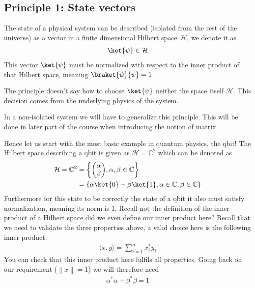 \subsection{Principle 1: State vectors}

The state of a physical system can be described (isolated from the rest of the universe) as a vector in a finite dimensional Hilbert space $\mathcal{H}$, we denote it as
\begin{align*} 
	\ket{\psi} \in \mathcal{H} 
\end{align*}
This vector $\ket{\psi}$ must be normalized with respect to the inner product of that Hilbert space, meaning $\braket{\psi}{\psi} = 1$.
\begin{framedremark}
The principle doesn't say how to choose $\ket{\psi}$ neither the space itself $\mathcal{H}$. This decision comes from the underlying physics of the system.
\end{framedremark}
\begin{framedremark}
In a non-isolated system we will have to generalize this principle. This will be done in later part of the course when introducing the notion of  matrix.
\end{framedremark}
    Hence let us start with the most basic example in quantum physics, the qbit! The Hilbert space describing a qbit is given as $\mathcal{H} = \mathbb{C}^2$ which can be denoted as 
	\begin{align*} 
		\mathcal{H} = \mathbb{C}^2 &= \left\{\begin{pmatrix} \alpha \\ \beta \end{pmatrix}, \alpha, \beta \in \mathbb{C} \right\} \\
								   &= \left\{\alpha \ket{0} + \beta\ket{1}, \alpha \in \mathbb{C}, \beta \in \mathbb{C}\right\}
	\end{align*}
	Furthermore for this state to be correctly the state of a qbit it also must satisfy normalization, meaning its norm is 1. Recall not the definition of the inner product of a Hilbert space did we even define our inner product here? Recall that we need to validate the three properties above, a valid choice here is the following inner product:
	\begin{align*} 
		\langle x, y\rangle  = \sum_{i= 1}^{n} x_i^{\ast}y_i
	\end{align*}
	You can check that this inner product here fulfils all properties. Going back on our requirement ($\left\|x\right\| = 1$) we will therefore need
	\begin{align*} 
		\alpha^\ast\alpha + \beta^\ast\beta = 1
	\end{align*}
